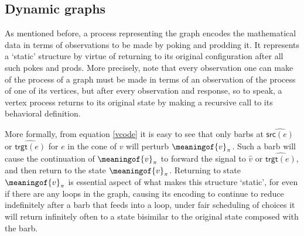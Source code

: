 \subsection{Dynamic graphs}

As mentioned before, a process representing the graph encodes the
mathematical data in terms of observations to be made by poking and
prodding it. It represents a `static' structure by virtue of returning
to its original configuration after all such pokes and prods. More
precisely, note that every observation one can make of the process of
a graph must be made in terms of an observation of the process of one
of its vertices, but after every observation and response, so to
speak, a vertex process returns to its original state by making a
recursive call to its behavioral definition.

More formally, from equation \ref{vcode} it is easy to see that only
barbs at $\widehat{\textsf{src}(e)}$ or $\widehat{\textsf{trgt}(e)}$
for $e$ in the cone of $v$ will perturb $\meaningof{v}_{\pi}$. Such a
barb will cause the continuation of $\meaningof{v}_{\pi}$ to forward
the signal to $\hat{v}$ or $\widehat{\textsf{trgt}(e)}$, and then
return to the state $\meaningof{v}_{\pi}$. Returning to state
$\meaningof{v}_{\pi}$ is essential aspect of what makes this structure
`static', for even if there are any loops in the graph, causing its
encoding to continue to reduce indefinitely after a barb that feeds
into a loop, under fair scheduling of choices it will return
infinitely often to a state bisimilar to the original state composed
with the barb.

